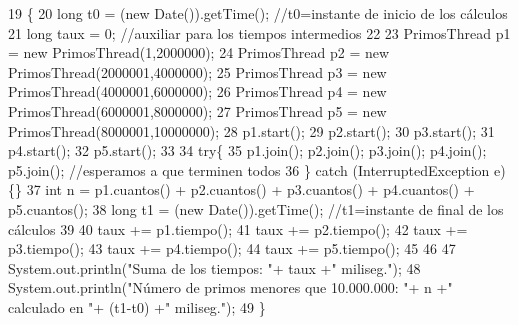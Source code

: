 \begin{DoxyCode}
19                                        \{
20            \textcolor{keywordtype}{long} t0 = (\textcolor{keyword}{new} Date()).getTime(); \textcolor{comment}{//t0=instante de inicio de los cálculos}
21            \textcolor{keywordtype}{long} taux = 0; \textcolor{comment}{//auxiliar para los tiempos intermedios}
22            
23            PrimosThread p1 = \textcolor{keyword}{new} PrimosThread(1,2000000);
24            PrimosThread p2 = \textcolor{keyword}{new} PrimosThread(2000001,4000000);
25            PrimosThread p3 = \textcolor{keyword}{new} PrimosThread(4000001,6000000);
26            PrimosThread p4 = \textcolor{keyword}{new} PrimosThread(6000001,8000000);
27            PrimosThread p5 = \textcolor{keyword}{new} PrimosThread(8000001,10000000);
28            p1.start();
29            p2.start();
30            p3.start();
31            p4.start();
32            p5.start();
33            
34            \textcolor{keywordflow}{try}\{
35             p1.join(); p2.join(); p3.join(); p4.join(); p5.join(); \textcolor{comment}{//esperamos a que terminen todos}
36            \} \textcolor{keywordflow}{catch} (InterruptedException e)\{\}
37            \textcolor{keywordtype}{int} n = p1.cuantos() + p2.cuantos() + p3.cuantos() + p4.cuantos() + p5.cuantos();
38            \textcolor{keywordtype}{long} t1 = (\textcolor{keyword}{new} Date()).getTime(); \textcolor{comment}{//t1=instante de final de los cálculos}
39            
40            taux += p1.tiempo();
41            taux += p2.tiempo();
42            taux += p3.tiempo();
43            taux += p4.tiempo();
44            taux += p5.tiempo();
45            
46            
47            System.out.println(\textcolor{stringliteral}{"Suma de los tiempos: "}+ taux +\textcolor{stringliteral}{" miliseg."});
48            System.out.println(\textcolor{stringliteral}{"Número de primos menores que 10.000.000: "}+ n +\textcolor{stringliteral}{" calculado en "}+ (t1-t0) +\textcolor{stringliteral}{"
       miliseg."});
49     \}
\end{DoxyCode}
